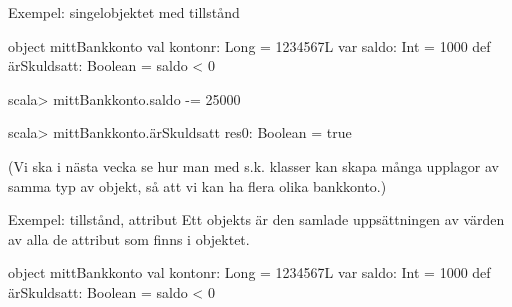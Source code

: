 \begin{Slide}{Exempel: singelobjektet med tillstånd} \SlideFontSmall
\begin{Code}[basicstyle=\ttfamily\fontsize{9}{11}\selectfont]
object mittBankkonto {
  val kontonr: Long        = 1234567L
  var saldo: Int           = 1000
  def ärSkuldsatt: Boolean = saldo < 0
}
\end{Code}
\begin{REPLnonum}
scala> mittBankkonto.saldo -= 25000

scala> mittBankkonto.ärSkuldsatt
res0: Boolean = true
\end{REPLnonum}

(Vi ska i nästa vecka se hur man med s.k. klasser kan skapa många upplagor av samma  typ av objekt, så att vi kan ha flera olika bankkonto.)
\end{Slide}



\begin{Slide}{Exempel: tillstånd, attribut}
Ett objekts  är den samlade uppsättningen av värden av alla de attribut som finns i objektet.
\begin{Code}[basicstyle=\ttfamily\fontsize{9}{11}\selectfont]
object mittBankkonto {
  val kontonr: Long        = 1234567L
  var saldo: Int           = 1000
  def ärSkuldsatt: Boolean = saldo < 0
}
\end{Code}
\end{Slide}


